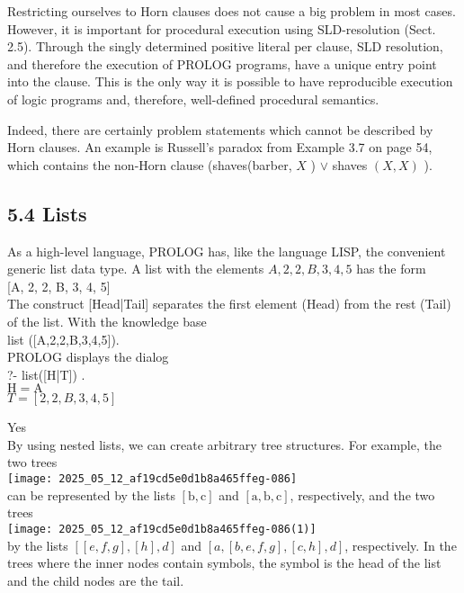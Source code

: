 \documentclass[10pt]{article}
\begin{document}
Restricting ourselves to Horn clauses does not cause a big problem in most cases. However, it is important for procedural execution using SLD-resolution (Sect. 2.5). Through the singly determined positive literal per clause, SLD resolution, and therefore the execution of PROLOG programs, have a unique entry point into the clause. This is the only way it is possible to have reproducible execution of logic programs and, therefore, well-defined procedural semantics.

Indeed, there are certainly problem statements which cannot be described by Horn clauses. An example is Russell's paradox from Example 3.7 on page 54, which contains the non-Horn clause (shaves(barber, $X$ ) $\vee$ shaves $(X, X)$ ).

\subsection*{5.4 Lists}
As a high-level language, PROLOG has, like the language LISP, the convenient generic list data type. A list with the elements $A, 2,2, B, 3,4,5$ has the form\\[0pt]
[A, 2, 2, B, 3, 4, 5]\\[0pt]
The construct [Head|Tail] separates the first element (Head) from the rest (Tail) of the list. With the knowledge base\\[0pt]
list ([A,2,2,B,3,4,5]).\\
PROLOG displays the dialog\\[0pt]
?- list([H|T])
.\\
$\mathrm{H}=\mathrm{A}$\\
$T=[2,2, B, 3,4,5]$

Yes\\
By using nested lists, we can create arbitrary tree structures. For example, the two trees\\
\texttt{[image: 2025\_05\_12\_af19cd5e0d1b8a465ffeg-086]}\\
can be represented by the lists $[\mathrm{b}, \mathrm{c}]$ and $[\mathrm{a}, \mathrm{b}, \mathrm{c}]$, respectively, and the two trees\\
\texttt{[image: 2025\_05\_12\_af19cd5e0d1b8a465ffeg-086(1)]}\\
by the lists $[[e, f, g],[h], d]$ and $[a,[b, e, f, g],[c, h], d]$, respectively. In the trees where the inner nodes contain symbols, the symbol is the head of the list and the child nodes are the tail.
\end{document}
